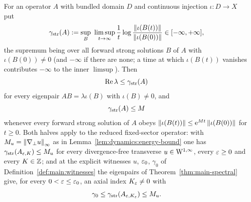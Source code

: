 \begin{lemma}
  \label{lem:dynamics:strong-solution-growth-floor}
  \leanok
  For an operator $A $ with bundled domain $D $ and continuous injection $\iota:D\to X $
  put
  \[
    \gamma_{\rm str}(A)
    :=\sup_B\ \limsup_{t\to\infty}\frac1t
    \log\frac{\left\|\iota(B(t))\right\|}{\left\|\iota(B(0))\right\|}
    \in[-\infty,+\infty],
  \]
  the supremum being over all forward strong solutions $B $ of $A $ with
  $\iota(B(0))\neq0 $ (and $-\infty $ if there are none; a time at which $\iota(B(t)) $
  vanishes contributes $-\infty $ to the inner $\limsup $).  Then
  \[
    \operatorname{Re}\lambda\leq\gamma_{\rm str}(A)
  \]
  for every eigenpair $AB=\lambda\iota(B) $ with $\iota(B)\neq0 $, and
  \[
    \gamma_{\rm str}(A)\leq M
  \]
  whenever every forward strong solution of $A $ obeys
  $\left\|\iota(B(t))\right\|\leq\mathrm{e}^{Mt}\left\|\iota(B(0))\right\| $ for $t\geq0 $.  Both halves apply to
  the reduced fixed-sector operator: with $M_u=\left\|\nabla_\perp u\right\|_\infty $ as in
  Lemma~\ref{lem:dynamics:energy-bound} one has $\gamma_{\rm str}(A_{\varepsilon,K})\leq M_u $
  for every divergence-free transverse $u\in\mathrm{W}^{1,\infty} $, every $\varepsilon\geq0 $ and every
  $K\in\mathbb{Z} $; and at the explicit witnesses $u $, $\varepsilon_0 $, $\gamma_0 $ of
  Definition~\ref{def:main:witnesses} the eigenpairs of Theorem~\ref{thm:main-spectral}
  give, for every $0<\varepsilon\leq\varepsilon_0 $, an axial index $K_\varepsilon\neq0 $ with
  \[
    \gamma_0\leq\gamma_{\rm str}(A_{\varepsilon,K_\varepsilon})\leq M_u.
  \]
\end{lemma}

